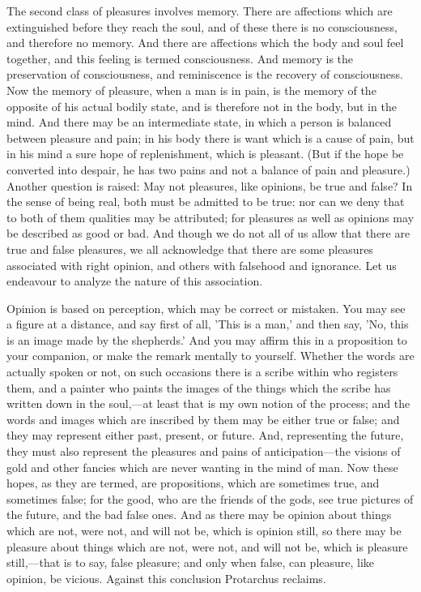 \documentclass[11pt,letter]{article}
\begin{document}
\par  The second class of pleasures involves memory. There are affections which are extinguished before they reach the soul, and of these there is no consciousness, and therefore no memory. And there are affections which the body and soul feel together, and this feeling is termed consciousness. And memory is the preservation of consciousness, and reminiscence is the recovery of consciousness. Now the memory of pleasure, when a man is in pain, is the memory of the opposite of his actual bodily state, and is therefore not in the body, but in the mind. And there may be an intermediate state, in which a person is balanced between pleasure and pain; in his body there is want which is a cause of pain, but in his mind a sure hope of replenishment, which is pleasant. (But if the hope be converted into despair, he has two pains and not a balance of pain and pleasure.) Another question is raised: May not pleasures, like opinions, be true and false? In the sense of being real, both must be admitted to be true: nor can we deny that to both of them qualities may be attributed; for pleasures as well as opinions may be described as good or bad. And though we do not all of us allow that there are true and false pleasures, we all acknowledge that there are some pleasures associated with right opinion, and others with falsehood and ignorance. Let us endeavour to analyze the nature of this association.

\par  Opinion is based on perception, which may be correct or mistaken. You may see a figure at a distance, and say first of all, 'This is a man,' and then say, 'No, this is an image made by the shepherds.' And you may affirm this in a proposition to your companion, or make the remark mentally to yourself. Whether the words are actually spoken or not, on such occasions there is a scribe within who registers them, and a painter who paints the images of the things which the scribe has written down in the soul,—at least that is my own notion of the process; and the words and images which are inscribed by them may be either true or false; and they may represent either past, present, or future. And, representing the future, they must also represent the pleasures and pains of anticipation—the visions of gold and other fancies which are never wanting in the mind of man. Now these hopes, as they are termed, are propositions, which are sometimes true, and sometimes false; for the good, who are the friends of the gods, see true pictures of the future, and the bad false ones. And as there may be opinion about things which are not, were not, and will not be, which is opinion still, so there may be pleasure about things which are not, were not, and will not be, which is pleasure still,—that is to say, false pleasure; and only when false, can pleasure, like opinion, be vicious. Against this conclusion Protarchus reclaims.
\end{document}
